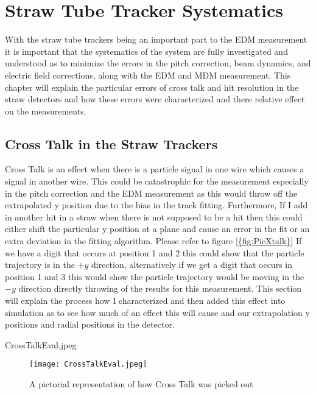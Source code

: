 \documentclass[./Thesis]{subfiles}
\begin{document}
\chapter{Straw Tube Tracker Systematics}

With the straw tube trackers being an important part to the EDM measurement it is important that the systematics of the system are fully investigated and understood as to minimize the errors in the pitch correction, beam dynamics, and electric field corrections, along with the EDM and MDM measurement. This chapter will explain the particular errors of cross talk and hit resolution in the straw detectors and how these errors were characterized and there relative effect on the measurements.

\section{Cross Talk in the Straw Trackers}
Cross Talk is an effect when there is a particle signal in one wire which causes a signal in another wire. This could be catastrophic for the measurement especially in the pitch correction and the EDM measurement as this would throw off the extrapolated y position due to the bias in the track fitting. Furthermore, If I add in another hit in a straw when there is not supposed to be a hit then this could either shift the particular y position at a plane and cause an error in the fit or an extra deviation in the fitting algorithm. Please refer to figure \ref{{fig:PicXtalk}} If we have a digit that occurs at position 1 and 2 this could show that the particle trajectory is in the $+y$ direction, alternatively if we get a digit that occurs in position 1 and 3 this would show the particle trajectory would be moving in the $-y$ direction directly throwing of the results for this measurement. This section will explain the process how I characterized and then added this effect into simulation as to see how much of an effect this will cause and our extrapolation y positions and radial positions in the detector.


CrossTalkEval.jpeg

\begin{figure}
	\centerline{\texttt{[image: CrossTalkEval.jpeg]}}
	\caption[ Pictorial Representation of Picking out Cross Talk]{ A pictorial representation of how Cross Talk was picked out}
	\label{fig:PicXtalk}
\end{figure}
\end{document}
